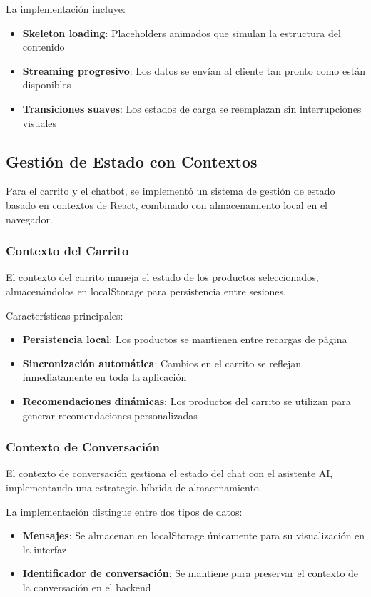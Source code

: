 La implementación incluye:
\begin{itemize}
    \item \textbf{Skeleton loading}: Placeholders animados que simulan la estructura del contenido
    \item \textbf{Streaming progresivo}: Los datos se envían al cliente tan pronto como están disponibles
    \item \textbf{Transiciones suaves}: Los estados de carga se reemplazan sin interrupciones visuales
\end{itemize}

\subsection{Gestión de Estado con Contextos}

Para el carrito y el chatbot, se implementó un sistema de gestión de estado basado en contextos de React, combinado con almacenamiento local en el navegador.

\subsubsection{Contexto del Carrito}

El contexto del carrito maneja el estado de los productos seleccionados, almacenándolos en localStorage para persistencia entre sesiones.

Características principales:
\begin{itemize}
    \item \textbf{Persistencia local}: Los productos se mantienen entre recargas de página
    \item \textbf{Sincronización automática}: Cambios en el carrito se reflejan inmediatamente en toda la aplicación
    \item \textbf{Recomendaciones dinámicas}: Los productos del carrito se utilizan para generar recomendaciones personalizadas
\end{itemize}

\subsubsection{Contexto de Conversación}

El contexto de conversación gestiona el estado del chat con el asistente AI, implementando una estrategia híbrida de almacenamiento.

La implementación distingue entre dos tipos de datos:
\begin{itemize}
    \item \textbf{Mensajes}: Se almacenan en localStorage únicamente para su visualización en la interfaz
    \item \textbf{Identificador de conversación}: Se mantiene para preservar el contexto de la conversación en el backend
\end{itemize}

